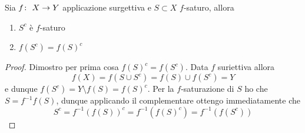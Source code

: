 \begin{lemma}
	Sia $f \colon\ X \rightarrow Y$ applicazione surgettiva e $S \subset X$ $f$-saturo, allora 
	\begin{enumerate}
		\item $S^c$ è $f$-saturo 
		\item $f(S^c) = f(S)^c$
	\end{enumerate}
\end{lemma}
\begin{proof}
	Dimostro per prima cosa $f(S)^c = f(S^c)$. Data $f$ suriettiva allora 
	\begin{equation*}
		f(X) = f(S \cup S^c) = f(S) \cup f(S^c) = Y
	\end{equation*}
	e dunque $f(S^c) = Y \setminus f(S) = f(S)^c$. 
	Per la $f$-saturazione di $S$ ho che $S = f^{-1}f(S)$, dunque applicando il complementare ottengo immediatamente che 
	\begin{equation*}
	S^c = f^{-1}(f(S))^c = f^{-1}(f(S)^c) = f^{-1}(f(S^c))
	\end{equation*}
\end{proof}

